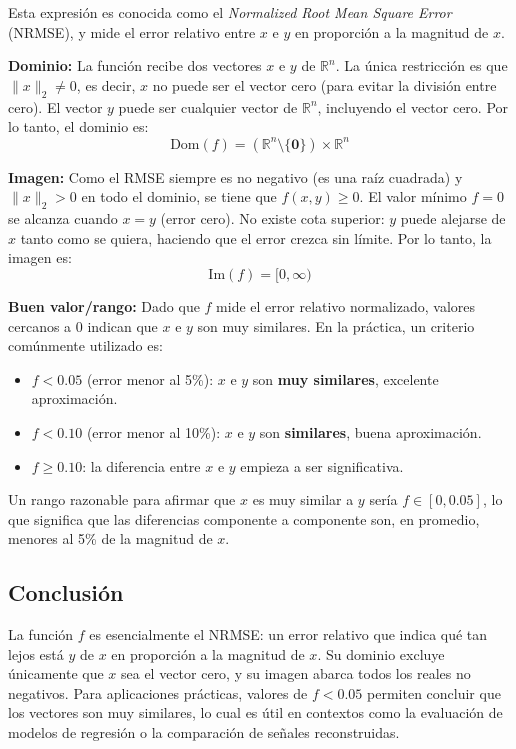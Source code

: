 \documentclass{article}
\begin{document}
Esta expresión es conocida como el \textit{Normalized Root Mean Square Error} (NRMSE), y mide el error relativo entre $x$ e $y$ en proporción a la magnitud de $x$.

\textbf{Dominio:} La función recibe dos vectores $x$ e $y$ de $\mathbb{R}^n$. La única restricción es que $\|x\|_2 \neq 0$, es decir, $x$ no puede ser el vector cero (para evitar la división entre cero). El vector $y$ puede ser cualquier vector de $\mathbb{R}^n$, incluyendo el vector cero. Por lo tanto, el dominio es:
\[
    \text{Dom}(f) = \left(\mathbb{R}^n \setminus \{\mathbf{0}\}\right) \times \mathbb{R}^n
\]

\textbf{Imagen:} Como el RMSE siempre es no negativo (es una raíz cuadrada) y $\|x\|_2 > 0$ en todo el dominio, se tiene que $f(x, y) \geq 0$. El valor mínimo $f = 0$ se alcanza cuando $x = y$ (error cero). No existe cota superior: $y$ puede alejarse de $x$ tanto como se quiera, haciendo que el error crezca sin límite. Por lo tanto, la imagen es:
\[
    \text{Im}(f) = [0, \infty)
\]

\textbf{Buen valor/rango:} Dado que $f$ mide el error relativo normalizado, valores cercanos a 0 indican que $x$ e $y$ son muy similares. En la práctica, un criterio comúnmente utilizado es:
\begin{itemize}
    \item $f < 0.05$ (error menor al 5\%): $x$ e $y$ son \textbf{muy similares}, excelente aproximación.
    \item $f < 0.10$ (error menor al 10\%): $x$ e $y$ son \textbf{similares}, buena aproximación.
    \item $f \geq 0.10$: la diferencia entre $x$ e $y$ empieza a ser significativa.
\end{itemize}

Un rango razonable para afirmar que $x$ es muy similar a $y$ sería $f \in [0, 0.05]$, lo que significa que las diferencias componente a componente son, en promedio, menores al 5\% de la magnitud de $x$.

\subsection{Conclusión}

La función $f$ es esencialmente el NRMSE: un error relativo que indica qué tan lejos está $y$ de $x$ en proporción a la magnitud de $x$. Su dominio excluye únicamente que $x$ sea el vector cero, y su imagen abarca todos los reales no negativos. Para aplicaciones prácticas, valores de $f < 0.05$ permiten concluir que los vectores son muy similares, lo cual es útil en contextos como la evaluación de modelos de regresión o la comparación de señales reconstruidas.
\end{document}
